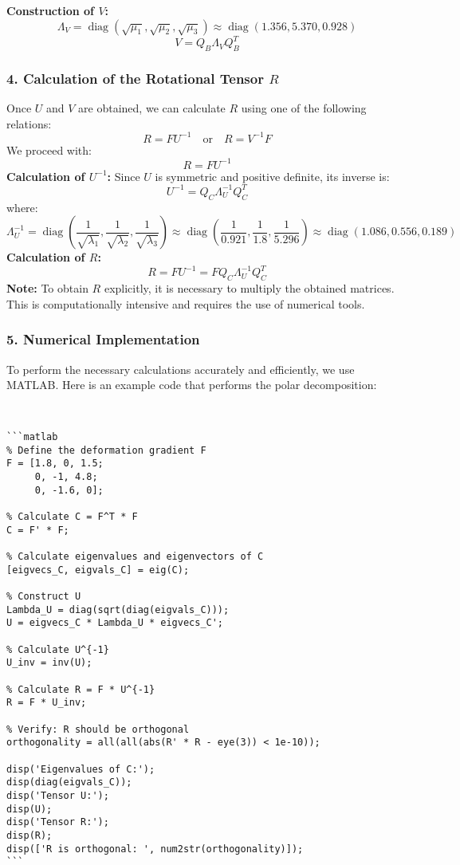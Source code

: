 \documentclass{article}
\begin{document}
\textbf{Construction of $ V $:}
$$
\Lambda_V = \operatorname{diag}(\sqrt{\mu_1}, \sqrt{\mu_2}, \sqrt{\mu_3}) \approx \operatorname{diag}(1.356, 5.370, 0.928)
$$
$$
V = Q_B \Lambda_V Q_B^T
$$

\subsubsection{4. Calculation of the Rotational Tensor $ R $}
Once $ U $ and $ V $ are obtained, we can calculate $ R $ using one of the following relations:
$$
R = F U^{-1} \quad \text{or} \quad R = V^{-1} F
$$
We proceed with:
$$
R = F U^{-1}
$$
\textbf{Calculation of $ U^{-1} $:}
Since $ U $ is symmetric and positive definite, its inverse is:
$$
U^{-1} = Q_C \Lambda_U^{-1} Q_C^T
$$
where:
$$
\Lambda_U^{-1} = \operatorname{diag}\left(\dfrac{1}{\sqrt{\lambda_1}}, \dfrac{1}{\sqrt{\lambda_2}}, \dfrac{1}{\sqrt{\lambda_3}}\right) \approx \operatorname{diag}\left(\dfrac{1}{0.921}, \dfrac{1}{1.8}, \dfrac{1}{5.296}\right) \approx \operatorname{diag}(1.086, 0.556, 0.189)
$$
\textbf{Calculation of $ R $:}
$$
R = F U^{-1} = F Q_C \Lambda_U^{-1} Q_C^T
$$
\textbf{Note:} To obtain $ R $ explicitly, it is necessary to multiply the obtained matrices. This is computationally intensive and requires the use of numerical tools.

\subsubsection{5. Numerical Implementation}
To perform the necessary calculations accurately and efficiently, we use MATLAB. Here is an example code that performs the polar decomposition:
\begin{lstlisting}
    

```matlab
% Define the deformation gradient F
F = [1.8, 0, 1.5;
     0, -1, 4.8;
     0, -1.6, 0];

% Calculate C = F^T * F
C = F' * F;

% Calculate eigenvalues and eigenvectors of C
[eigvecs_C, eigvals_C] = eig(C);

% Construct U
Lambda_U = diag(sqrt(diag(eigvals_C)));
U = eigvecs_C * Lambda_U * eigvecs_C';

% Calculate U^{-1}
U_inv = inv(U);

% Calculate R = F * U^{-1}
R = F * U_inv;

% Verify: R should be orthogonal
orthogonality = all(all(abs(R' * R - eye(3)) < 1e-10));

disp('Eigenvalues of C:');
disp(diag(eigvals_C));
disp('Tensor U:');
disp(U);
disp('Tensor R:');
disp(R);
disp(['R is orthogonal: ', num2str(orthogonality)]);
```
\end{lstlisting}
\end{document}
